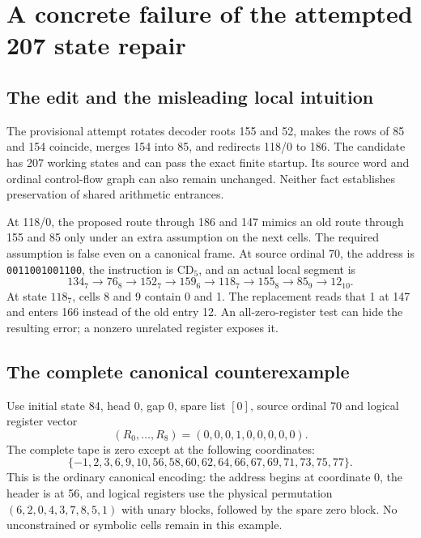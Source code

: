 \documentclass[11pt,letterpaper]{article}
\begin{document}
\section{A concrete failure of the attempted 207 state repair}
\subsection{The edit and the misleading local intuition}
The provisional attempt rotates decoder roots 155 and 52, makes the rows of
85 and 154 coincide, merges 154 into 85, and redirects 118/0 to 186. The
candidate has 207 working states and can pass the exact finite startup. Its
source word and ordinal control-flow graph can also remain unchanged.
Neither fact establishes preservation of shared arithmetic entrances.

At 118/0, the proposed route through 186 and 147 mimics an old route through
155 and 85 only under an extra assumption on the next cells. The required
assumption is false even on a canonical frame. At source ordinal 70, the
address is \texttt{0011001001100}, the instruction is $\mathrm{CD}_5$, and an
actual local segment is
\[
 134_7\to76_8\to152_7\to159_6\to118_7\to155_8\to85_9\to12_{10}.
\]
At state $118_7$, cells 8 and 9 contain 0 and 1. The replacement reads that 1
at 147 and enters 166 instead of the old entry 12. An all-zero-register test
can hide the resulting error; a nonzero unrelated register exposes it.

\subsection{The complete canonical counterexample}
Use initial state 84, head 0, gap 0, spare list $[0]$, source ordinal 70 and
logical register vector
\[
 (R_0,\ldots,R_8)=(0,0,0,1,0,0,0,0,0).
\]
The complete tape is zero except at the following coordinates:
\[
 \{-1,2,3,6,9,10,56,58,60,62,64,66,67,69,71,73,75,77\}.
\]
This is the ordinary canonical encoding: the address begins at coordinate 0,
the header is at 56, and logical registers use the physical permutation
$(6,2,0,4,3,7,8,5,1)$ with unary blocks, followed by the spare zero block.
No unconstrained or symbolic cells remain in this example.
\end{document}
